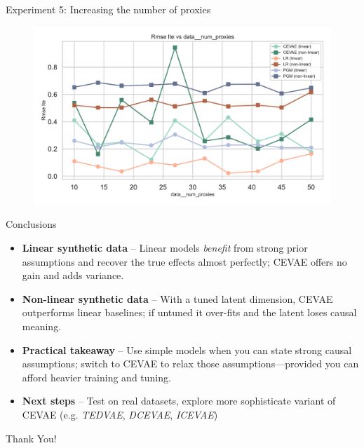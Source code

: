 \documentclass[10pt]{beamer}
\begin{document}
\begin{frame}{Experiment 5: Increasing the number of proxies}
    \begin{figure}[H]
      \includegraphics[width=\textwidth]{images/MyRun_data__num_proxies--rmse_ite.pdf}
    \end{figure}
\end{frame}

\begin{frame}{Conclusions}

\begin{itemize}\setlength\itemsep{6pt}

  \item \textbf{Linear synthetic data} -- 
        Linear models \emph{benefit} from strong prior assumptions and recover the true effects almost perfectly; CEVAE offers no gain and adds variance.

  \item \textbf{Non-linear synthetic data} -- 
        With a tuned latent dimension, CEVAE outperforms linear baselines; if untuned it over-fits and the latent loses causal meaning.

  \item \textbf{Practical takeaway}  
         -- Use simple models when you can state strong causal assumptions; switch to CEVAE to relax those assumptions—provided you can afford heavier training and tuning.

  \item \textbf{Next steps} -- 
        Test on real datasets, explore more sophisticate variant of CEVAE (e.g. \emph{TEDVAE}, \emph{DCEVAE}, \emph{ICEVAE})

\end{itemize}

\end{frame}

{
\begin{frame}[standout]
\thispagestyle{empty}
  {\LARGE Thank You!}
\end{frame}
}
\end{document}
